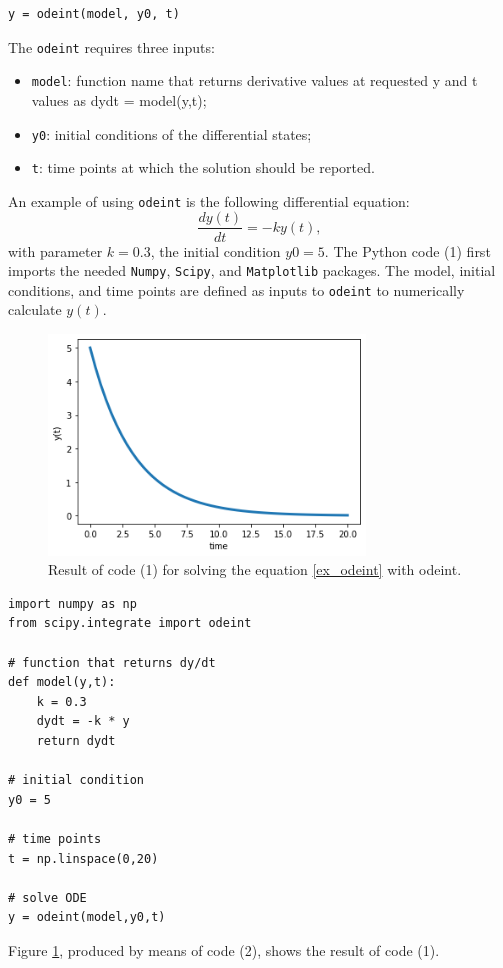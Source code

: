 \documentclass[11pt,a4paper]{article}
\begin{document}
\lstset{language=Python}
\lstset{frame=lines}
\lstset{basicstyle=\footnotesize}
\begin{lstlisting}
y = odeint(model, y0, t)
\end{lstlisting}
The \verb|odeint| requires three inputs: 
\begin{itemize}
	\item \verb|model|: function name that returns derivative values at requested y and t values as dydt = model(y,t);
	\item \verb|y0|: initial conditions of the differential states;
	\item \verb|t|: time points at which the solution should be reported.
\end{itemize}
An example of using \verb|odeint| is the following differential equation: 
\begin{equation}
\label{ex_odeint}
\dfrac{d y(t)}{d t} = -ky(t),
\end{equation}
with parameter $k=0.3$, the initial condition $y0=5$. The Python code (1) first imports the needed \verb|Numpy|, \verb|Scipy|, and \verb|Matplotlib| packages.  The model, initial conditions, and time points are defined as inputs to \verb|odeint| to numerically calculate $y(t)$.
\begin{figure}
	\centering
	\includegraphics[width=0.75\textwidth]{./Images/odeint_ex.png}
	\caption{Result of code (1) for solving the equation \eqref{ex_odeint} with odeint.}
	\label{fig:ex_odeint}
\end{figure}  

\lstset{language=Python}
\lstset{frame=lines}
\lstset{basicstyle=\footnotesize}
\begin{lstlisting}
import numpy as np
from scipy.integrate import odeint

# function that returns dy/dt
def model(y,t):
	k = 0.3
	dydt = -k * y
	return dydt

# initial condition
y0 = 5

# time points
t = np.linspace(0,20)

# solve ODE
y = odeint(model,y0,t)
\end{lstlisting}
Figure \ref{fig:ex_odeint}, produced by means of code (2), shows the result of code (1).
\end{document}
